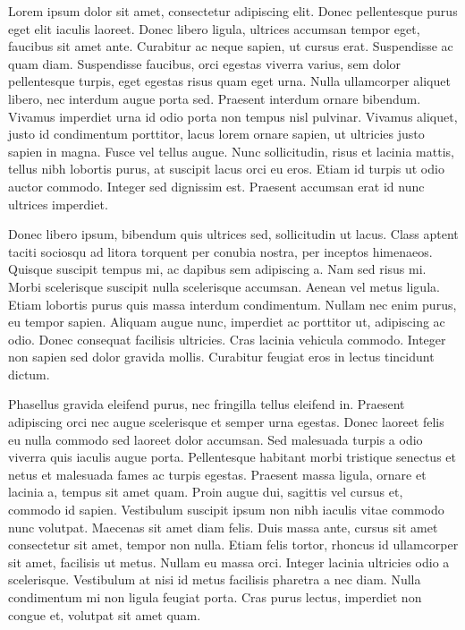 \begin{multicols}{2}
Lorem ipsum dolor sit amet, consectetur adipiscing elit. Donec pellentesque purus eget elit iaculis laoreet. Donec libero ligula, ultrices accumsan tempor eget, faucibus sit amet ante. Curabitur ac neque sapien, ut cursus erat. Suspendisse ac quam diam. Suspendisse faucibus, orci egestas viverra varius, sem dolor pellentesque turpis, eget egestas risus quam eget urna. Nulla ullamcorper aliquet libero, nec interdum augue porta sed. Praesent interdum ornare bibendum. Vivamus imperdiet urna id odio porta non tempus nisl pulvinar. Vivamus aliquet, justo id condimentum porttitor, lacus lorem ornare sapien, ut ultricies justo sapien in magna. Fusce vel tellus augue. Nunc sollicitudin, risus et lacinia mattis, tellus nibh lobortis purus, at suscipit lacus orci eu eros. Etiam id turpis ut odio auctor commodo. Integer sed dignissim est. Praesent accumsan erat id nunc ultrices imperdiet.

Donec libero ipsum, bibendum quis ultrices sed, sollicitudin ut lacus. Class aptent taciti sociosqu ad litora torquent per conubia nostra, per inceptos himenaeos. Quisque suscipit tempus mi, ac dapibus sem adipiscing a. Nam sed risus mi. Morbi scelerisque suscipit nulla scelerisque accumsan. Aenean vel metus ligula. Etiam lobortis purus quis massa interdum condimentum. Nullam nec enim purus, eu tempor sapien. Aliquam augue nunc, imperdiet ac porttitor ut, adipiscing ac odio. Donec consequat facilisis ultricies. Cras lacinia vehicula commodo. Integer non sapien sed dolor gravida mollis. Curabitur feugiat eros in lectus tincidunt dictum.

Phasellus gravida eleifend purus, nec fringilla tellus eleifend in. Praesent adipiscing orci nec augue scelerisque et semper urna egestas. Donec laoreet felis eu nulla commodo sed laoreet dolor accumsan. Sed malesuada turpis a odio viverra quis iaculis augue porta. Pellentesque habitant morbi tristique senectus et netus et malesuada fames ac turpis egestas. Praesent massa ligula, ornare et lacinia a, tempus sit amet quam. Proin augue dui, sagittis vel cursus et, commodo id sapien. Vestibulum suscipit ipsum non nibh iaculis vitae commodo nunc volutpat. Maecenas sit amet diam felis. Duis massa ante, cursus sit amet consectetur sit amet, tempor non nulla. Etiam felis tortor, rhoncus id ullamcorper sit amet, facilisis ut metus. Nullam eu massa orci. Integer lacinia ultricies odio a scelerisque. Vestibulum at nisi id metus facilisis pharetra a nec diam. Nulla condimentum mi non ligula feugiat porta. Cras purus lectus, imperdiet non congue et, volutpat sit amet quam.


\end{multicols}
